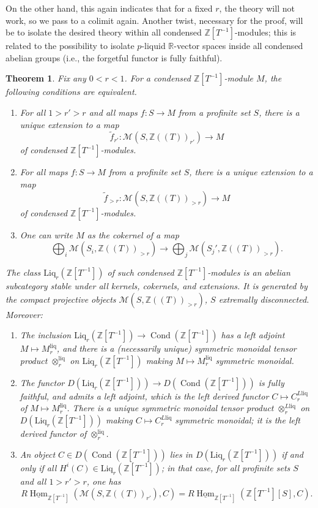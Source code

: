 \documentclass[11pt]{amsbook}
\DeclareMathOperator{\Hom}{Hom}
\newcommand{\intHom}{\underline{\Hom}}
\DeclareMathOperator{\Cond}{Cond}
\renewcommand*{\tilde}{\widetilde}
\numberwithin{equation}{section}
\newtheorem{theorem}{Theorem}
\numberwithin{theorem}{section}
\theoremstyle{definition}
\begin{document}
On the other hand, this again indicates that for a fixed $r$, the theory will not work, so we pass to a colimit again. Another twist, necessary for the proof, will be to isolate the desired theory within all condensed $\mathbb Z[T^{-1}]$-modules; this is related to the possibility to isolate $p$-liquid $\mathbb R$-vector spaces inside all condensed abelian groups (i.e., the forgetful functor is fully faithful).

\begin{theorem}\label{thm:liquidarithmetic} Fix any $0<r<1$. For a condensed $\mathbb Z[T^{-1}]$-module $M$, the following conditions are equivalent.
\begin{enumerate}
\item For all $1>r'>r$ and all maps $f: S\to M$ from a profinite set $S$, there is a unique extension to a map
\[
\tilde{f}_{r'}: \mathcal M(S,\mathbb Z((T))_{r'})\to M
\]
of condensed $\mathbb Z[T^{-1}]$-modules.
\item For all maps $f: S\to M$ from a profinite set $S$, there is a unique extension to a map
\[
\tilde{f}_{>r}: \mathcal M(S,\mathbb Z((T))_{>r})\to M
\]
of condensed $\mathbb Z[T^{-1}]$-modules.
\item One can write $M$ as the cokernel of a map
\[
\bigoplus_i \mathcal M(S_i,\mathbb Z((T))_{>r})\to \bigoplus_j \mathcal M(S_j',\mathbb Z((T))_{>r}).
\]
\end{enumerate}

The class $\mathrm{Liq}_r(\mathbb Z[T^{-1}])$ of such condensed $\mathbb Z[T^{-1}]$-modules is an abelian subcategory stable under all kernels, cokernels, and extensions. It is generated by the compact projective objects $\mathcal M(S,\mathbb Z((T))_{>r})$, $S$ extremally disconnected. Moreover:
\begin{enumerate}
\item The inclusion $\mathrm{Liq}_r(\mathbb Z[T^{-1}])\to \Cond(\mathbb Z[T^{-1}])$ has a left adjoint $M\mapsto M^{\mathrm{liq}}_r$, and there is a (necessarily unique) symmetric monoidal tensor product $\otimes^{\mathrm{liq}}_r$ on $\mathrm{Liq}_r(\mathbb Z[T^{-1}])$ making $M\mapsto M^{\mathrm{liq}}_r$ symmetric monoidal.
\item The functor $D(\mathrm{Liq}_r(\mathbb Z[T^{-1}]))\to D(\Cond(\mathbb Z[T^{-1}]))$ is fully faithful, and admits a left adjoint, which is the left derived functor $C\mapsto C^{L\mathrm{liq}}_r$ of $M\mapsto M^{\mathrm{liq}}_r$. There is a unique symmetric monoidal tensor product $\otimes^{L\mathrm{liq}}_r$ on $D(\mathrm{Liq}_r(\mathbb Z[T^{-1}]))$ making $C\mapsto C^{L\mathrm{liq}}_r$ symmetric monoidal; it is the left derived functor of $\otimes^{\mathrm{liq}}_r$.
\item An object $C\in D(\Cond(\mathbb Z[T^{-1}]))$ lies in $D(\mathrm{Liq}_r(\mathbb Z[T^{-1}]))$ if and only if all $H^i(C)\in \mathrm{Liq}_r(\mathbb Z[T^{-1}])$; in that case, for all profinite sets $S$ and all $1>r'>r$, one has
\[
R\intHom_{\mathbb Z[T^{-1}]}(\mathcal M(S,\mathbb Z((T))_{r'}),C) = R\intHom_{\mathbb Z[T^{-1}]}(\mathbb Z[T^{-1}][S],C).
\]
\end{enumerate}
\end{theorem}
\end{document}
